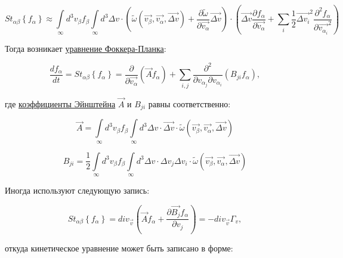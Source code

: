 \documentclass[10pt, a4paper]{article}
\begin{document}
\begin{equation*}
	St_{\alpha\beta}\left\lbrace f_\alpha\right\rbrace \approx \int\limits_{\infty} d^3v_\beta f_\beta \int\limits_{\infty}d^3\Delta v \cdot \left( \widetilde{\omega}(\overrightarrow{v_\beta}, \overrightarrow{v_\alpha}, \overrightarrow{\Delta v})+\frac{\partial \widetilde{\omega}}{\partial \overrightarrow{v_\alpha}}\overrightarrow{\Delta v} \right) \cdot \left(\overrightarrow{\Delta v}\frac{\partial f_\alpha}{\partial \overrightarrow{v_\alpha}}+\sum\limits_{i}\frac{1}{2}\overrightarrow{\Delta v_i}^2\frac{\partial^2f_\alpha}{\partial \overrightarrow{v_{\alpha_{i}}}^2}\right)
\end{equation*}

Тогда возникает \uline{уравнение Фоккера-Планка}:

\begin{equation} \label{eq:Fokker-Planck_eq}
	\frac{df_\alpha}{dt} = St_{\alpha\beta}\left\lbrace f_\alpha\right\rbrace = \frac{\partial}{\partial \overrightarrow{v_\alpha}} \left(\vec{A}f_\alpha\right) + \sum\limits_{i,j}\frac{\partial^2}{\partial v_{\alpha_{j}}\partial v_{\alpha_{i}}} \left(B_{ji}f_\alpha\right),
\end{equation}

где \uline{коэффициенты Эйнштейна} $\vec{A}$ и $B_{ji}$ равны соответственно:

\begin{equation*}
	\vec{A} = \int\limits_{\infty} d^3v_\beta f_\beta \int\limits_{\infty} d^3\Delta v \cdot \overrightarrow{\Delta v} \cdot \widetilde{\omega} (\overrightarrow{v_\beta}, \overrightarrow{v_\alpha}, \overrightarrow{\Delta v})
\end{equation*}

\begin{equation*}
	B_{ji} = \frac{1}{2} \int\limits_{\infty} d^3v_\beta f_\beta \int\limits_{\infty} d^3\Delta v \cdot \Delta v_j \Delta v_i \cdot \widetilde{\omega} (\overrightarrow{v_\beta}, \overrightarrow{v_\alpha}, \overrightarrow{\Delta v})
\end{equation*}

Иногда используют следующую запись:

\begin{equation*}
	St_{\alpha\beta}\left\lbrace f_\alpha\right\rbrace = div_{\vec{v}} \left(\vec{A}f_\alpha+\frac{\partial \vec{B_j}f_\alpha}{\partial v_j}\right) = -div_{\vec{v}}\Gamma_v,
\end{equation*}

откуда кинетическое уравнение может быть записано в форме:
\end{document}
